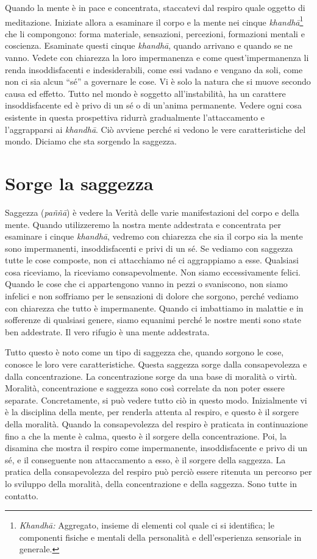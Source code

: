 Quando la mente è in pace e concentrata, staccatevi dal respiro quale
oggetto di meditazione. Iniziate allora a esaminare il corpo e la mente
nei cinque \emph{khandhā}\footnote{\emph{Khandhā:} Aggregato, insieme di
  elementi col quale ci si identifica; le componenti fisiche e mentali
  della personalità e dell'esperienza sensoriale in generale.} che li
compongono: forma materiale, sensazioni, percezioni, \mbox{formazioni} mentali
e coscienza. Esaminate questi cinque \emph{khandhā}, quando arrivano e
quando se ne vanno. Vedete con chiarezza la loro impermanenza e come
quest'impermanenza li renda insoddisfacenti e indesiderabili, come essi
vadano e vengano da soli, come non ci sia alcun ``sé'' a governare le
cose. Vi è solo la natura che si muove secondo causa ed effetto. Tutto
nel mondo è soggetto all'instabilità, ha un carattere insoddisfacente ed
è privo di un sé o di un'anima permanente. Vedere ogni cosa esistente in
questa prospettiva ridurrà gradualmente l'attaccamento e l'aggrapparsi
ai \emph{khandhā}. Ciò avviene perché si vedono le vere caratteristiche
del mondo. Diciamo che sta sorgendo la saggezza.

\section{Sorge la saggezza}

Saggezza (\emph{paññā}) è vedere la Verità delle varie manifestazioni
del corpo e della mente. Quando utilizzeremo la nostra mente addestrata
e concentrata per esaminare i cinque \emph{khandhā}, vedremo con
chiarezza che sia il corpo sia la mente sono impermanenti,
insoddisfacenti e privi di un sé. Se vediamo con saggezza tutte le cose
composte, non ci attacchiamo né ci aggrappiamo a esse. Qualsiasi cosa
riceviamo, la riceviamo consapevolmente. Non siamo eccessivamente
felici. Quando le cose che ci appartengono vanno in pezzi o svaniscono,
non siamo infelici e non soffriamo per le sensazioni di dolore che
sorgono, perché vediamo con chiarezza che tutto è impermanente. Quando
ci imbattiamo in malattie e in sofferenze di qualsiasi genere, siamo
equanimi perché le nostre menti sono state ben addestrate. Il vero
rifugio è una mente addestrata.

Tutto questo è noto come un tipo di saggezza che, quando sorgono le
cose, conosce le loro vere caratteristiche. Questa saggezza sorge dalla
consapevolezza e dalla concentrazione. La concentrazione sorge da una
base di moralità o virtù. Moralità, concentrazione e saggezza sono così
correlate da non poter essere separate. Concretamente, si può vedere
tutto ciò in questo modo. Inizialmente vi è la disciplina della mente,
per renderla attenta al respiro, e questo è il sorgere della moralità.
Quando la consapevolezza del respiro è praticata in continuazione fino a
che la mente è calma, questo è il sorgere della concentrazione. Poi, la
disamina che mostra il respiro come impermanente, insoddisfacente e
privo di un sé, e il conseguente non attaccamento a esso, è il sorgere
della saggezza. La pratica della consapevolezza del respiro può perciò
essere ritenuta un percorso per lo sviluppo della moralità, della
concentrazione e della saggezza. Sono tutte in contatto.

